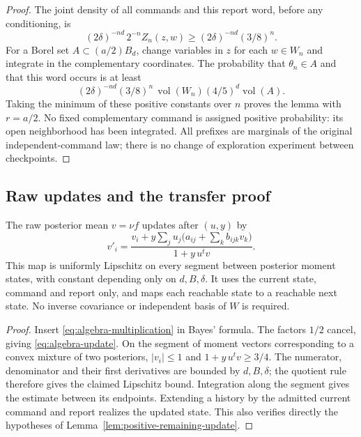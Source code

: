 \begin{proof}
The joint density of all commands and this report word, before any
conditioning, is
\[
 (2\delta)^{-nd}\,2^{-n}Z_n(z,w)
                         \ge (2\delta)^{-nd}(3/8)^n.
\]
For a Borel set $A\subset(a/2)B_d$, change variables in $z$ for each
$w\in W_n$ and integrate in the complementary coordinates. The
probability that $\theta_n\in A$ and that this word occurs is at least
\[
 (2\delta)^{-nd}(3/8)^n\,\operatorname{vol}(W_n)
                                      (4/5)^d\operatorname{vol}(A).
\]
Taking the minimum of these positive constants over $n$ proves the
lemma with $r=a/2$. No fixed complementary command is assigned
positive probability: its open neighborhood has been integrated.
All prefixes are marginals of the original independent-command law;
there is no change of exploration experiment between checkpoints.
\end{proof}

\subsection{Raw updates and the transfer proof}
\begin{lemma}
\label{lem:algebra-update}
The raw posterior mean $v=\nu f$ updates after $(u,y)$ by
\begin{equation}\label{eq:algebra-update}
 v'_i=\frac{v_i+y\sum_j u_j\bigl(a_{ij}+\sum_k b_{ijk}v_k\bigr)}
                        {1+y\,u^tv}.
\end{equation}
This map is uniformly Lipschitz on every segment between posterior
moment states, with constant depending only on $d,B,\delta$.
It uses the current state, command and report only, and maps each
reachable state to a reachable next state. No inverse covariance or
independent basis of $W$ is required.
\end{lemma}
\begin{proof}
Insert \eqref{eq:algebra-multiplication} in Bayes' formula. The factors
$1/2$ cancel, giving \eqref{eq:algebra-update}. On the segment of
moment vectors corresponding to a convex mixture of two posteriors,
$|v_i|\le1$ and $1+y\,u^tv\ge3/4$. The numerator, denominator and
their first derivatives are bounded by $d,B,\delta$; the quotient rule
therefore gives the claimed Lipschitz bound. Integration along the
segment gives the estimate between its endpoints. Extending a history
by the admitted current command and report realizes the updated state.
This also verifies directly the hypotheses of
Lemma~\ref{lem:positive-remaining-update}.
\end{proof}

